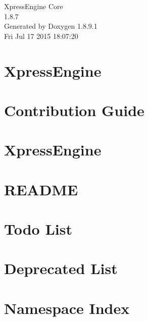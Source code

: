 \documentclass[twoside]{book}
\newcommand{\+}{\discretionary{\mbox{\scriptsize$\hookleftarrow$}}{}{}}
\newcommand{\clearemptydoublepage}{%
  \newpage{\pagestyle{empty}\cleardoublepage}%
}
\begin{document}
\hypersetup{pageanchor=false,
             bookmarks=true,
             bookmarksnumbered=true,
             pdfencoding=unicode
            }
\begin{titlepage}
\vspace*{7cm}
\begin{center}%
{\Large Xpress\+Engine Core \\[1ex]\large 1.\+8.\+7 }\\
\vspace*{1cm}
{\large Generated by Doxygen 1.8.9.1}\\
\vspace*{0.5cm}
{\small Fri Jul 17 2015 18:07:20}\\
\end{center}
\end{titlepage}
\clearemptydoublepage
\tableofcontents
\clearemptydoublepage
{}
\hypersetup{pageanchor=true}

\chapter{Xpress\+Engine}
\label{index}\hypertarget{index}{}
\chapter{Contribution Guide}
\label{md_CONTRIBUTING}
\hypertarget{md_CONTRIBUTING}{}

\chapter{Xpress\+Engine}
\label{md_README}
\hypertarget{md_README}{}

\chapter{R\+E\+A\+D\+M\+E}
\label{md_xe-manual-api_README}
\hypertarget{md_xe-manual-api_README}{}

\chapter{Todo List}
\label{todo}
\hypertarget{todo}{}

\chapter{Deprecated List}
\label{deprecated}
\hypertarget{deprecated}{}

\chapter{Namespace Index}

\end{document}
